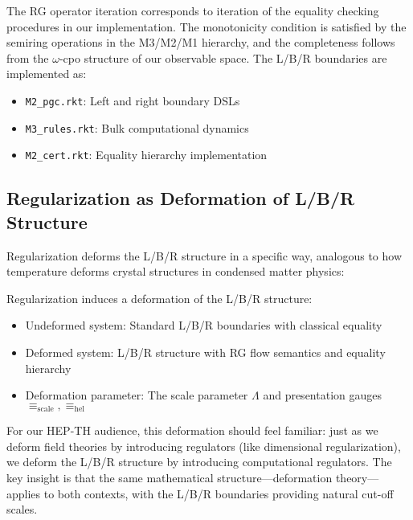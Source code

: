 \begin{remark}
\label{rem:implementation-connection-lbr}
The RG operator iteration corresponds to iteration of the equality checking procedures in our implementation. The monotonicity condition is satisfied by the semiring operations in the M3/M2/M1 hierarchy, and the completeness follows from the $\omega$-cpo structure of our observable space. The L/B/R boundaries are implemented as:
\begin{itemize}
\item \texttt{M2\_pgc.rkt}: Left and right boundary DSLs
\item \texttt{M3\_rules.rkt}: Bulk computational dynamics
\item \texttt{M2\_cert.rkt}: Equality hierarchy implementation
\end{itemize}
\end{remark}

\subsection{Regularization as Deformation of L/B/R Structure}

Regularization deforms the L/B/R structure in a specific way, analogous to how temperature deforms crystal structures in condensed matter physics:

\begin{definition}
Regularization induces a deformation of the L/B/R structure:
\begin{itemize}
\item Undeformed system: Standard L/B/R boundaries with classical equality
\item Deformed system: L/B/R structure with RG flow semantics and equality hierarchy
\item Deformation parameter: The scale parameter $\Lambda$ and presentation gauges $\equiv_{\text{scale}}, \equiv_{\text{hel}}$
\end{itemize}
\end{definition}

For our HEP-TH audience, this deformation should feel familiar: just as we deform field theories by introducing regulators (like dimensional regularization), we deform the L/B/R structure by introducing computational regulators. The key insight is that the same mathematical structure—deformation theory—applies to both contexts, with the L/B/R boundaries providing natural cut-off scales.

